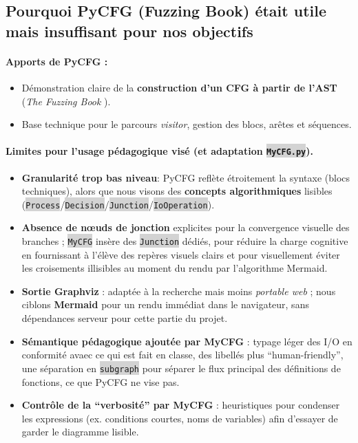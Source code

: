 \documentclass[11pt,a4paper]{article}
\let\cite\parencite
\newcommand{\code}[1]{\colorbox{lightgray}{\texttt{\small #1}}}
\begin{document}
\subsection{Pourquoi PyCFG (Fuzzing Book) était utile mais insuffisant pour nos objectifs}
\paragraph{Apports de PyCFG :}
\begin{itemize}
\item Démonstration claire de la \textbf{construction d’un CFG à partir de l’AST} (\textit{The Fuzzing Book} \cite{fuzzingbook}).
\item Base technique pour le parcours \textit{visitor}, gestion des blocs, arêtes et séquences.
\end{itemize}

\paragraph{Limites pour l’usage pédagogique visé (et adaptation \code{MyCFG.py}).}
\begin{itemize}
\item \textbf{Granularité trop bas niveau}: PyCFG reflète étroitement la syntaxe (blocs techniques), alors que 
nous visons des \textbf{concepts algorithmiques} lisibles (\code{Process}/\code{Decision}/\code{Junction}/\code{IoOperation}).
\item \textbf{Absence de nœuds de jonction} explicites pour la convergence visuelle des branches ; 
\code{MyCFG} insère des \code{Junction} dédiés, pour réduire la charge cognitive en fournissant à l'élève des repères 
visuels clairs et pour visuellement éviter les croisements illisibles au moment du rendu par l'algorithme Mermaid.
\item \textbf{Sortie Graphviz} : adaptée à la recherche mais moins \textit{portable web} ; nous ciblons \textbf{Mermaid}
 pour un rendu immédiat dans le navigateur, sans dépendances serveur pour cette partie du projet.
\item \textbf{Sémantique pédagogique ajoutée par MyCFG} : typage léger des I/O en conformité avaec ce qui est fait
en classe, des libellés plus ``human-friendly'', une séparation en \code{subgraph} pour séparer le flux principal
des définitions de fonctions, ce que PyCFG ne vise pas.
\item \textbf{Contrôle de la ``verbosité'' par MyCFG} : heuristiques pour condenser les expressions (ex. 
conditions courtes, noms de variables) afin d'essayer de garder le diagramme lisible.
\end{itemize}
\end{document}
